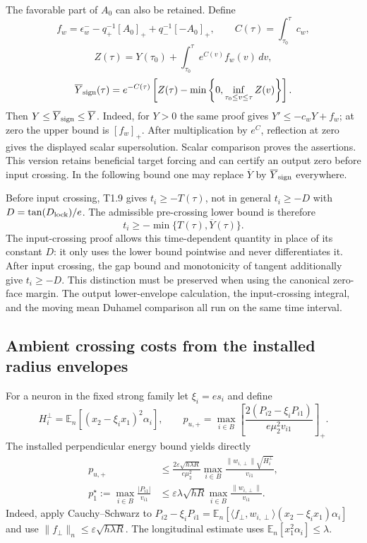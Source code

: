 \documentclass{article} %
\theoremstyle{plain}
\theoremstyle{definition}
\theoremstyle{remark}
\begin{document}
The favorable part of $A_0$ can also be retained. Define
\[
 f_w=\epsilon_w^- -q_+^{-1}[A_0]_+
                     +q_-^{-1}[-A_0]_+,\qquad
 C(\tau)=\int_{\tau_0}^\tau c_w,
\]
\[
 Z(\tau)=Y(\tau_0)+\int_{\tau_0}^\tau e^{C(v)}f_w(v)\,dv,
\]
\begin{equation}\label{sbflux:reflected-output}
 \overline Y_{\rm sign}(\tau)
 =e^{-C(\tau)}\left[Z(\tau)-
      \min\left\{0,\inf_{\tau_0\le v\le\tau}Z(v)\right\}\right].
\end{equation}
Then $Y\le\overline Y_{\rm sign}\le\overline Y$.
Indeed, for $Y>0$ the same proof gives $Y'\le-c_wY+f_w$;
at zero the upper bound is $[f_w]_+$. After multiplication by $e^C$,
reflection at zero gives the displayed scalar supersolution. Scalar
comparison proves the assertions. This version retains beneficial target
forcing and can certify an output zero before input crossing. In the
following bound one may replace $\overline Y$ by
$\overline Y_{\rm sign}$ everywhere.

Before input crossing, T1.9 gives $t_i\ge-T(\tau)$, not in general
$t_i\ge-D$ with $D=\tan(D_{\rm lock})/e$.
The admissible pre-crossing lower bound is therefore
\[
 t_i\ge-\min\{T(\tau),\overline Y(\tau)\}.
\]
The input-crossing proof allows this time-dependent quantity in place of
its constant $D$: it only uses the lower bound pointwise and never
differentiates it. After input crossing, the gap bound and monotonicity
of tangent additionally give $t_i\ge-D$. This distinction must be
preserved when using the canonical zero-face margin. The output
lower-envelope calculation, the input-crossing integral, and the moving
mean Duhamel comparison all run on the same time interval.

\subsection{Ambient crossing costs from the installed radius envelopes}

For a neuron in the fixed strong family let $\xi_i=e s_i$ and define
\[
 H_i^\perp=\mathbb E_n[(x_2-\xi_ix_1)^2\alpha_i],\qquad
 p_{u,+}=\max_{i\in B}\left[
 \frac{2(P_{i2}-\xi_iP_{i1})}{e\mu_2^2v_{i1}}\right]_+.
\]
The installed perpendicular energy bound yields directly
\begin{align*}
 p_{u,+}
 &\le\frac{2\varepsilon\sqrt{h\lambda R}}{e\mu_2^2}
       \max_{i\in B}\frac{\|w_{i,\perp}\|\sqrt{H_i^\perp}}{v_{i1}},\\
 p_1^\star:=\max_{i\in B}\frac{|P_{i1}|}{v_{i1}}
 &\le\varepsilon\lambda\sqrt{hR}
       \max_{i\in B}\frac{\|w_{i,\perp}\|}{v_{i1}}.
\end{align*}
Indeed, apply Cauchy--Schwarz to
$P_{i2}-\xi_iP_{i1}
=\mathbb E_n[\langle f_\perp,w_{i,\perp}\rangle
(x_2-\xi_ix_1)\alpha_i]$ and use
$\|f_\perp\|_n\le\varepsilon\sqrt{h\lambda R}$.
The longitudinal estimate uses $\mathbb E_n[x_1^2\alpha_i]\le\lambda$.
\end{document}
